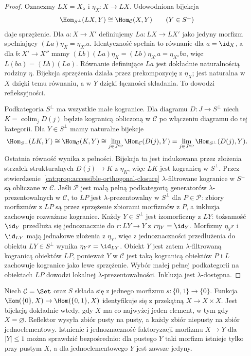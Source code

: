\begin{proof}
Oznaczmy $L X=X_\lambda$ i $\eta_X:X\to LX$. Udowodniona bijekcja
\[
 \Hom_{S^\perp}(LX,Y)\cong\Hom_{\mathcal C}(X,Y)
 \qquad(Y\in S^\perp)
\]
daje sprzężenie. Dla $a:X\to X'$ definiujemy $La:LX\to LX'$ jako jedyny morfizm spełniający $(La)\eta_X=\eta_{X'}a$. Identyczność spełnia to równanie dla $a=\id_X$, a dla $b:X'\to X''$ mamy $(Lb)(La)\eta_X=(Lb)\eta_{X'}a=\eta_{X''}ba$, więc $L(ba)=(Lb)(La)$. Równanie definiujące $La$ jest dokładnie naturalnością rodziny $\eta$. Bijekcja sprzężenia działa przez prekompozycję z $\eta_X$; jest naturalna w $X$ dzięki temu równaniu, a w $Y$ dzięki łączności składania. To dowodzi refleksyjności.

Podkategoria $S^\perp$ ma wszystkie małe kogranice. Dla diagramu $D:J\to S^\perp$ niech $K=\operatorname{colim}_j D(j)$ będzie kogranicą obliczoną w $\mathcal C$ po włączeniu diagramu do tej kategorii. Dla $Y\in S^\perp$ mamy naturalne bijekcje
\[
 \Hom_{S^\perp}(LK,Y)
 \cong\Hom_{\mathcal C}(K,Y)
 \cong\lim_{j\in J^{\mathrm{op}}}\Hom_{\mathcal C}(D(j),Y)
 =\lim_{j\in J^{\mathrm{op}}}\Hom_{S^\perp}(D(j),Y).
\]
Ostatnia równość wynika z pełności. Bijekcja ta jest indukowana przez złożenia strzałek strukturalnych $D(j)\to K$ z $\eta_K$, więc $LK$ jest kogranicą w $S^\perp$. Przez stwierdzenie~\ref{cat:prop:accessible-orthogonal-closure} $\lambda$-filtrowane kogranice w $S^\perp$ są obliczane w $\mathcal C$. Jeśli $\mathcal P$ jest małą pełną podkategorią generatorów $\lambda$-prezentowalnych w $\mathcal C$, to $LP$ jest $\lambda$-prezentowalny w $S^\perp$ dla $P\in\mathcal P$: zbiory morfizmów z $LP$ są przez sprzężenie zbiorami morfizmów z $P$, a inkluzja zachowuje rozważane kogranice. Każdy $Y\in S^\perp$ jest izomorficzny z $LY$: tożsamość $\id_Y$ przedłuża się jednoznacznie do $r:LY\to Y$ z $r\eta_Y=\id_Y$. Morfizmy $\eta_Yr$ i $\id_{LY}$ mają jednakowe złożenia z $\eta_Y$, więc z jednoznaczności przedłużenia do obiektu $LY\in S^\perp$ wynika $\eta_Yr=\id_{LY}$. Obiekt $Y$ jest zatem $\lambda$-filtrowaną kogranicą obiektów $LP$, ponieważ $Y$ w $\mathcal C$ jest taką kogranicą obiektów $P$ i $L$ zachowuje kogranice jako lewe sprzężenie. Wybór małej pełnej podkategorii na obiektach $LP$ dowodzi lokalnej $\lambda$-prezentowalności. Inkluzja jest $\lambda$-dostępna.
\end{proof}

\begin{przyklad}\label{cat:ex:accessible-orthogonal-subterminal}
Niech $\mathcal C=\Set$ oraz $S$ składa się z jednego morfizmu $s:\{0,1\}\to\{0\}$. Funkcja $\Hom(\{0\},X)\to\Hom(\{0,1\},X)$ identyfikuje się z przekątną $X\to X\times X$. Jest bijekcją dokładnie wtedy, gdy $X$ ma co najwyżej jeden element, w tym gdy $X=\varnothing$. Reflektor wysyła zbiór pusty na pusty, a każdy zbiór niepusty na zbiór jednoelementowy. Istnienie i jednoznaczność faktoryzacji morfizmu $X\to Y$ dla $|Y|\leq1$ można sprawdzić bezpośrednio: dla pustego $Y$ taki morfizm istnieje tylko przy pustym $X$, a dla jednoelementowego $Y$ jest zawsze jedyny.
\end{przyklad}

